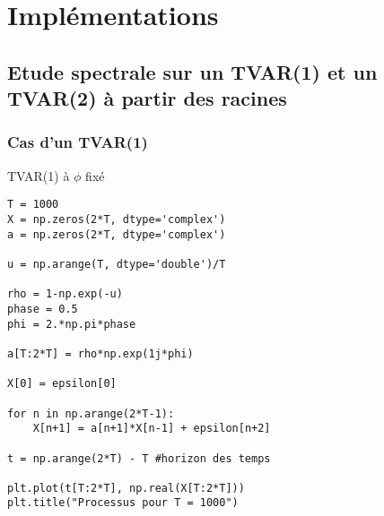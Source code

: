 \documentclass{report}
\begin{document}
\chapter{Implémentations}
\section{Etude spectrale sur un TVAR(1) et un TVAR(2) à partir des racines}
\subsection{Cas d'un TVAR(1)}
\renewcommand\listingscaption{Code}
\begin{listing}
\caption{TVAR(1) à $\phi$ fixé}
\begin{verbatim}
T = 1000
X = np.zeros(2*T, dtype='complex')
a = np.zeros(2*T, dtype='complex')

u = np.arange(T, dtype='double')/T

rho = 1-np.exp(-u)
phase = 0.5
phi = 2.*np.pi*phase

a[T:2*T] = rho*np.exp(1j*phi)

X[0] = epsilon[0]
    
for n in np.arange(2*T-1):
    X[n+1] = a[n+1]*X[n-1] + epsilon[n+2]
    
t = np.arange(2*T) - T #horizon des temps

plt.plot(t[T:2*T], np.real(X[T:2*T]))
plt.title("Processus pour T = 1000")
\end{verbatim}
\end{listing}

\renewcommand\listoflistingscaption{Table des codes sources}
\listoflistings


\end{document}
